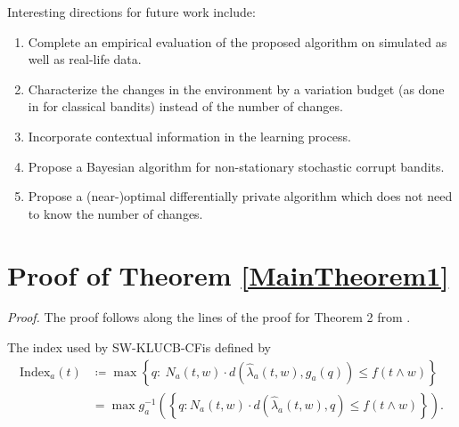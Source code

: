 \documentclass[letterpaper]{article} %
\newcommand{\defined}{\coloneqq}
\newcommand{\SWKLUCBCF}{\textsc{SW-KLUCB-CF}}
\newcommand{\windowsize}{w}
\begin{document}
Interesting directions for future work include:
\begin{enumerate}
    \item Complete an empirical evaluation of the proposed algorithm on simulated as well as real-life data. 
    \item Characterize the changes in the environment by a variation budget (as done in \citet{NIPS2014_903ce922} for classical bandits) instead of the number of changes.
    \item Incorporate contextual information in the learning process. %
    \item Propose a Bayesian algorithm for non-stationary stochastic corrupt bandits.
    \item Propose a (near-)optimal differentially private algorithm which does not need to know the number of changes.
\end{enumerate}



\onecolumn

\appendix
\label{sec:Proof_MainTheorem1}
\section{Proof of Theorem \ref{MainTheorem1}}
\textit{Proof.} The proof follows along the lines of the proof for Theorem 2 from \citet{pmlr-v83-gajane18a}.

The index used by \SWKLUCBCF is defined by
\begin{align*}
    \mathrm{Index}_a(t) &\defined \max 
\left\{ q:\  N_a(t, \windowsize)\cdot{}d\left(\hat{\lambda}_a(t, \windowsize), g_a(q)\right) \leq f\left(t \wedge \windowsize\right) \right\} \\
&= \max g_a^{-1}\left( \left\{q: N_a(t, \windowsize)\cdot{}d\left(\hat{\lambda}_a(t, \windowsize), q\right) \leq f\left(t \wedge \windowsize\right)\right\} \right).
\end{align*}

\end{document}
